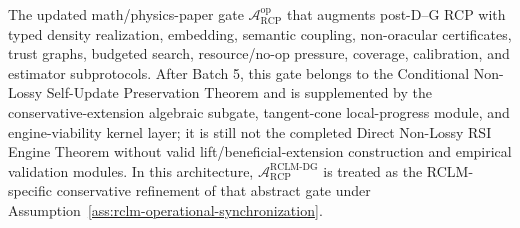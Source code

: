 \documentclass[11pt,a4paper]{article}
\newcommand{\Acal}{\mathcal A}
\newcommand{\RCP}{\mathrm{RCP}}
\newcommand{\RCLM}{\mathrm{RCLM}}
\newcommand{\DG}{\mathrm{DG}}
\begin{document}
\begin{description}[leftmargin=2.5cm,style=nextline]
\item[Operational RCP gate] The updated math/physics-paper gate \(\Acal_{\RCP}^{\mathrm{op}}\) that augments post-D--G RCP with typed density realization, embedding, semantic coupling, non-oracular certificates, trust graphs, budgeted search, resource/no-op pressure, coverage, calibration, and estimator subprotocols.  After Batch 5, this gate belongs to the Conditional Non-Lossy Self-Update Preservation Theorem and is supplemented by the conservative-extension algebraic subgate, tangent-cone local-progress module, and engine-viability kernel layer; it is still not the completed Direct Non-Lossy RSI Engine Theorem without valid lift/beneficial-extension construction and empirical validation modules.  In this architecture, \(\Acal_{\RCP}^{\RCLM\text{-}\DG}\) is treated as the RCLM-specific conservative refinement of that abstract gate under Assumption~\ref{ass:rclm-operational-synchronization}.
\end{description}
\end{document}
